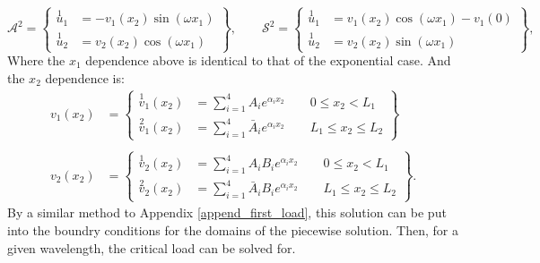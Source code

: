 \documentclass[11pt]{report}
\begin{document}
\begin{equation} \label{eq:piece_const_u1_modes}
\mathcal{A}^2 =
\left \{
\begin{aligned}
  \overset{1}{u}_1 &= -v_1(x_2)\sin(\omega x_1) \\
  \overset{1}{u}_2 &=  v_2(x_2)\cos(\omega x_1)
\end{aligned}
\right \} , \qquad
\mathcal{S}^2 =
\left \{
\begin{aligned}
  \overset{1}{u}_1 &= v_1(x_2)\cos(\omega x_1) - v_1(0) \\
  \overset{1}{u}_2 &=  v_2(x_2)\sin(\omega x_1)
\end{aligned}
\right \},
\end{equation}
Where the $x_1$ dependence above is identical to that of the exponential case. And the $x_2$ dependence is:
\begin{equation} \label{eq:piece_const_u1_v}
\begin{aligned}
v_1(x_2) &=
\left \{
\begin{aligned}
  \overset{1}{v}_1(x_2) &= \sum_{i = 1}^{4}A_ie^{\alpha_i x_2} \qquad 0 \leq x_2 < L_1 \\
  \overset{2}{v}_1(x_2) &= \sum_{i = 1}^{4}\bar{A}_ie^{\alpha_i x_2} \qquad L_1 \leq x_2 \leq L_2
\end{aligned}
\right \} \\
\\
v_2(x_2) &=
\left \{
\begin{aligned}
  \overset{1}{v}_2(x_2) &= \sum_{i = 1}^{4} A_i B_i e^{\alpha_i x_2} \qquad 0 \leq x_2 < L_1 \\
  \overset{2}{v}_2(x_2) &= \sum_{i = 1}^{4} \bar{A}_i B_i e^{\alpha_i x_2} \qquad L_1 \leq x_2 \leq L_2
\end{aligned}
\right \}.
\end{aligned}
\end{equation}
By a similar method to Appendix \ref{append_first_load}, this solution can be put into the boundry conditions for the domains of the piecewise solution. Then, for a given wavelength, the critical load can be solved for.
\end{document}
